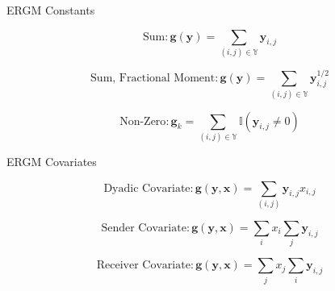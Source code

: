 \documentclass{beamer}
\begin{document}
\begin{frame}{ERGM Constants}

$$\text{Sum}:\bm{g(y)} = \sum_{(i,j) {\in} \mathbb{Y}}\bm{y}_{i,j}$$

$$\text{Sum, Fractional Moment}:\bm{g(y)} = \sum_{(i,j) {\in} \mathbb{Y}}\bm{y}_{i,j}^{1/2}$$

$$\text{Non-Zero}: \bm{g}_k = \sum_{(i,j) {\in} \mathbb{Y}} \mathbb{I}(\bm{y}_{i,j} \neq 0)$$

\end{frame}

\begin{frame}{ERGM Covariates}

$$ \text{Dyadic Covariate}: \bm{g(y,x)} = \sum_{(i,j)} \bm{y}_{i,j}x_{i,j}$$ 

$$ \text{Sender Covariate}: \bm{g(y,x)} = \sum_{i}x_i \sum_{j} \bm{y}_{i,j}$$

$$ \text{Receiver Covariate}: \bm{g(y,x)} = \sum_{j}x_j \sum_{i} \bm{y}_{i,j}$$

\end{frame}
\end{document}
